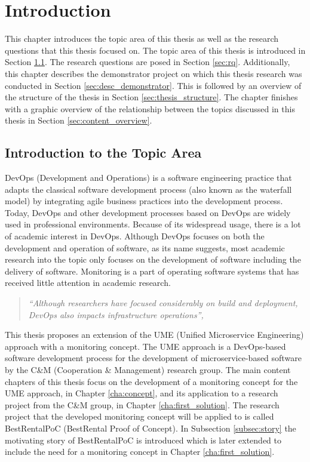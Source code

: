 \chapter{Introduction}
\label{cha:introduction}

This chapter introduces the topic area of this thesis as well as the research questions
that this thesis focused on. The topic area of this thesis is introduced in Section \ref{sec:intro_topic}.
The research questions are posed in Section \ref{sec:rq}. Additionally,
this chapter describes the demonstrator project on which this thesis research
was conducted in Section \ref{sec:desc_demonstrator}. This is followed by an overview
of the structure of the thesis in Section \ref{sec:thesis_structure}. The chapter finishes
with a graphic overview of the relationship between the topics discussed in this thesis
in Section \ref{sec:content_overview}.

\section{Introduction to the Topic Area}
\label{sec:intro_topic}

DevOps (Development and Operations) is a software engineering practice that adapts the classical software development process (also known as the waterfall model)
by integrating agile business practices into the development process. Today, DevOps and other
development processes based on DevOps are widely used in professional environments. Because
of its widespread usage, there is a lot of academic interest in DevOps. Although DevOps focuses
on both the development and operation of software, as its name suggests, most academic research
into the topic only focuses on the development of software including the delivery of software.
Monitoring is a part of operating software systems that has received little attention in academic research.

\begin{quote}
\textit{``Although researchers have focused considerably on build and deployment,
DevOps also impacts infrastructure operations'', \cite{EG+16}}
\end{quote}

This thesis proposes an extension of the UME (Unified Microservice Engineering) approach with a monitoring concept.
The UME approach is a DevOps-based software development process for the development of microservice-based
software by the C\&M (Cooperation \& Management) research group. The main content chapters of this thesis
focus on the development of a monitoring concept for the UME approach, in Chapter \ref{cha:concept},
and its application to a research project from the C\&M group, in Chapter \ref{cha:first_solution}.
The research project that the developed monitoring concept will be applied to is called
BestRentalPoC (BestRental Proof of Concept).
In Subsection \ref{subsec:story} the motivating story of BestRentalPoC is introduced which is later extended
to include the need for a monitoring concept in Chapter \ref{cha:first_solution}.


